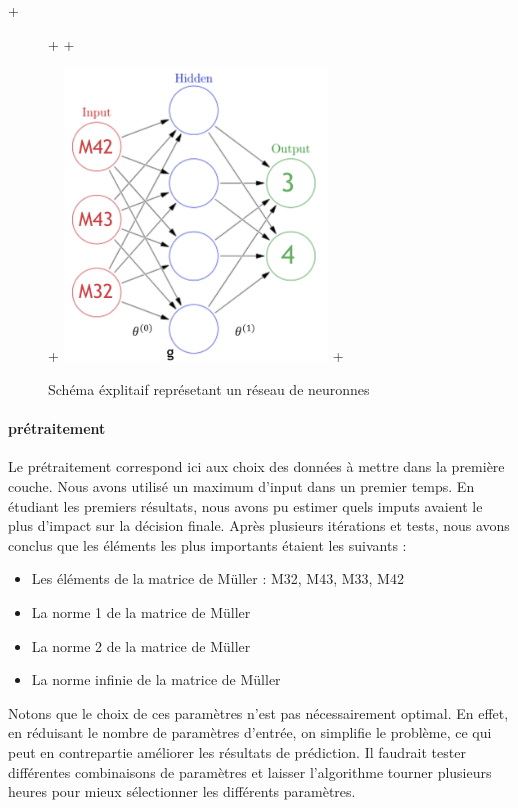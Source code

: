 \documentclass[a4paper,10pt]{report}
\begin{document}
+\begin{figure}[H]
 +  \centering  
 +  \caption{Schéma éxplitaif représetant un réseau de neuronnes}
 +  \includegraphics[width=7cm]{nn_explanation.png}
 +\end{figure}

\paragraph{prétraitement}
Le prétraitement correspond ici aux choix des données à mettre dans la première couche. Nous avons utilisé un maximum d'input dans un premier temps. En étudiant les premiers résultats, nous avons pu estimer quels imputs avaient le plus d’impact sur la décision finale. Après plusieurs itérations et tests, nous avons conclus que les éléments les plus importants étaient les suivants :

\begin{itemize}

    \item Les éléments de la matrice de Müller : M32, M43, M33, M42

    \item La norme 1 de la matrice de Müller 
    
    \item La norme 2 de la matrice de Müller 

    \item La norme infinie de la matrice de Müller  

\end{itemize}

Notons que le choix de ces paramètres n’est pas nécessairement optimal. En effet, en réduisant le nombre de paramètres d’entrée, on simplifie le problème, ce qui peut en contrepartie améliorer les résultats de prédiction. Il faudrait tester différentes combinaisons de paramètres et laisser l’algorithme tourner plusieurs heures pour mieux sélectionner les différents paramètres.
\end{document}
